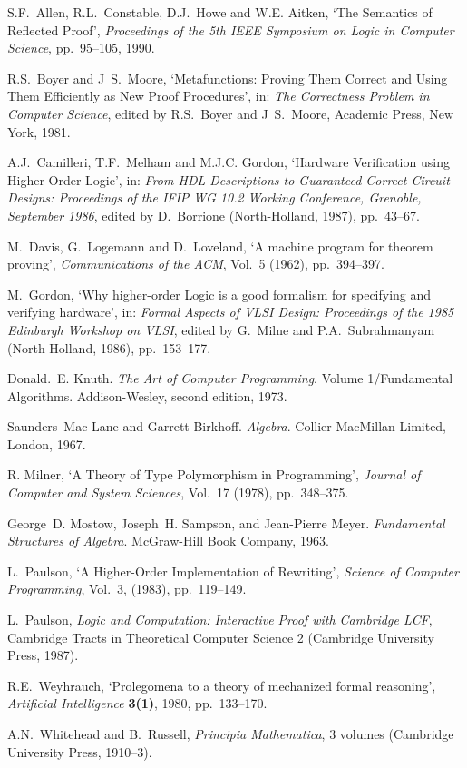 \begin{thebibliography}{99}

S.F.\ Allen, R.L.\ Constable, D.J.\ Howe and W.E. Aitken,
`The Semantics of Reflected Proof',
{\it Proceedings of the 5th IEEE Symposium on Logic in Computer Science\/},
pp.\ 95--105, 1990.

R.S.\ Boyer and J\ S.\ Moore, `Metafunctions: Proving Them Correct and
Using Them Efficiently as New Proof Procedures', in: {\it The
Correctness Problem in Computer Science}, edited by
R.S.\ Boyer and J\ S.\ Moore, Academic Press, New York, 1981.

A.J.\ Camilleri, T.F.\ Melham and M.J.C. Gordon,
`Hardware Verification using Higher-Order Logic',
in: {\it From HDL Descriptions to Guaranteed Correct \mbox{Circuit}
Designs: Proceedings of the IFIP WG 10.2 Working Conference, Grenoble,
September 1986}, edited by D.\ Borrione (North-Holland, 1987), pp.\ 43--67.

M.\ Davis, G.\ Logemann and D.\ Loveland, `A machine program for
theorem proving', {\it Communications of the ACM}, Vol.\ 5 (1962),
pp.\ 394--397.

M.\ Gordon,
`Why higher-order Logic
is a good formalism for specifying and verifying hardware',
in: {\it Formal Aspects of VLSI Design: Proceedings of the 1985 Edinburgh
      Workshop on VLSI\/}, edited by G.\ Milne and
P.A.\ Subrahmanyam (North-Holland, 1986), pp.\ 153--177.

Donald.\ E. Knuth.
{\em The Art of Computer Programming}. Volume 1/Fundamental
  Algorithms. Addison-Wesley, second edition, 1973.

Saunders\ Mac Lane and Garrett Birkhoff. {\em Algebra}.
Collier-MacMillan Limited, London, 1967.

R. Milner,
`A Theory of Type Polymorphism in Programming',
{\it Journal of Computer and System Sciences}, Vol.\ 17 (1978),
pp.\ 348--375.

George\ D. Mostow, Joseph\ H. Sampson, and Jean-Pierre Meyer.
{\em Fundamental Structures of Algebra}. McGraw-Hill Book Company, 1963.

L.\ Paulson,
`A Higher-Order Implementation of Rewriting',
{\it Science of Computer Programming}, Vol.\ 3, (1983), pp.\ 119--149.

 L.\ Paulson,
{\it Logic and Computation: Interactive Proof with Cambridge LCF},
Cambridge Tracts in Theoretical Computer Science 2
(Cambridge University Press, 1987).

R.E.\ Weyhrauch, `Prolegomena to a theory of mechanized formal reasoning',
{\it Artificial Intelligence\/} {\bf 3(1)}, 1980, pp.\ 133--170.

A.N.\ Whitehead and B.\ Russell,
{\it Principia Mathematica},
3 volumes (Cambridge University Press, 1910--3).

\end{thebibliography}


